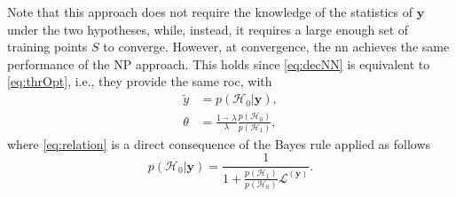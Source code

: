 \documentclass[conference,draftcls,onecolumn]{IEEEtran}
\begin{document}
Note that this approach does not require the knowledge of the statistics of $\bm{y}$ under the two hypotheses, while, instead, it requires a large enough set of training points $S$ to converge.
However, at convergence, the \ac{nn} achieves the same performance of the NP approach. This holds since \eqref{eq:decNN} is equivalent to \eqref{eq:thrOpt}, i.e., they provide the same \ac{roc}, with
\begin{align}
	\tilde{y} &= p(\mathcal{H}_0|\bm y), \\
	\label{eq:relation}
	\theta &= \frac{1-\lambda}{\lambda} \frac{p(\mathcal{H}_0)}{p(\mathcal{H}_1)},	
\end{align}  
where \eqref{eq:relation} is a direct consequence of the Bayes rule applied as follows 
\begin{equation}
	p(\mathcal{H}_0| \bm y) = \frac{1}{1+  \frac{p(\mathcal{H}_1)}{p(\mathcal{H}_0)} \mathcal{L}^{(\bm y)}}.	
\end{equation}




\end{document}
